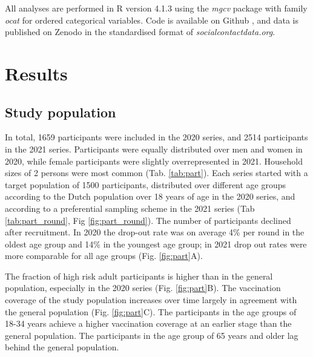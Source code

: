 \documentclass[fleqn,10pt]{wlscirep}
\begin{document}
All analyses are performed in R version 4.1.3 \cite{R_2022} using the \textit{mgcv} package \cite{Wood_2017} with family \textit{ocat} for ordered categorical variables. Code is available on Github \cite{Github_RIVM}, and data is published on Zenodo \cite{Zenodo_2022} in the standardised format of \textit{socialcontactdata.org}.

\section*{Results}

\subsection*{Study population}

In total, 1659 participants were included in the 2020 series, and 2514 participants in the 2021 series. Participants were equally distributed over men and women in 2020, while female participants were slightly overrepresented in 2021. Household sizes of 2 persons were most common (Tab. \ref{tab:part}). Each series started with a target population of 1500 participants, distributed over different age groups according to the Dutch population over 18 years of age in the 2020 series, and according to a preferential sampling scheme in the 2021 series (Tab \ref{tab:part_round}, Fig \ref{fig:part_round}). The number of participants declined after recruitment. In 2020 the drop-out rate was on average 4\% per round in the oldest age group and 14\% in the youngest age group; in 2021 drop out rates were more comparable for all age groups (Fig. \ref{fig:part}A).


The fraction of high risk adult participants is higher than in the general population, especially in the 2020 series (Fig. \ref{fig:part}B). The vaccination coverage of the study population increases over time largely in agreement with the general population (Fig. \ref{fig:part}C). The participants in the age groups of 18-34 years achieve a higher vaccination coverage at an earlier stage than the general population. The participants in the age group of 65 years and older lag behind the general population. 
\end{document}
